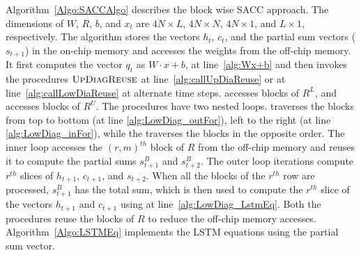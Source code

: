 
Algorithm~\ref{Algo:SACCAlgo} describes the block wise SACC approach. The dimensions of $W$, $R$, $b$, and $x_t$ are $4N{\times}L$, $4N{\times}N$, $4N{\times}1$, and $L{\times}1$, respectively. The algorithm stores the vectors $h_t$, $c_t$, and the partial sum vectors ($s_{t+1}$) in the on-chip memory and accesses the weights from the off-chip memory. It first computes the vector $q_t$ as $W{\cdot}x{+}b$, at line~\ref{alg:Wx+b} and then invokes the procedures $\textproc{UpDiagReuse}$ at line~\ref{alg:callUpDiaReuse} or   at line~\ref{alg:callLowDiaReuse} at alternate time steps.  accesses blocks of $R^L$, and  accesses blocks of $R^U$. The procedures have two nested loops.  traverses the blocks from top to bottom (at line \ref{alg:LowDiag_outFor}), left to the right (at line \ref{alg:LowDiag_inFor}), while the  traverses the blocks in the opposite order. The inner loop accesses the $(r,m)^{th}$ block of $R$ from the off-chip memory and reuses it to compute the partial sums $s^B_{t+1}$ and $s^B_{t+2}$. The outer loop iterations compute $r^{th}$ slices of $h_{t+1}$, $c_{t+1}$, and $s_{t+2}$.
When all the blocks of the $r^{th}$ row are processed, $s^B_{t+1}$ has the total sum, which is then used to compute the $r^{th}$ slice of the vectors $h_{t+1}$ and $c_{t+1}$ using  at line~\ref{alg:LowDiag_LstmEq}. 
Both the procedures reuse the blocks of $R$ to reduce the off-chip memory accesses. Algorithm~\ref{Algo:LSTMEq} implements the LSTM equations using the partial sum vector.

